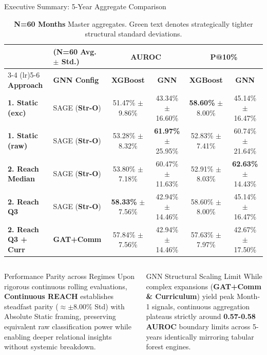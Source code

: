 \documentclass[aspectratio=169,11pt]{beamer}
\begin{document}
\begin{frame}{Executive Summary: 5-Year Aggregate Comparison}

  \renewcommand{\arraystretch}{1.1}
  \begin{table}
    \tiny
    \setlength{\tabcolsep}{4pt}
    \begin{tabular}{ll cccc}
      \toprule
      & \tiny(N=60 Avg. $\pm$ Std.) & \multicolumn{2}{c}{\textbf{AUROC}} & \multicolumn{2}{c}{\textbf{P@10\%}} \\
      \cmidrule(lr){3-4} \cmidrule(lr){5-6}
      \textbf{Approach} & \textbf{GNN Config} & \textbf{XGBoost} & \textbf{GNN} & \textbf{XGBoost} & \textbf{GNN} \\
      \midrule
      \textbf{1. Static (exc)}  & SAGE (\textbf{Str-O})  & 51.47\% $\pm$ 9.86\% & 43.34\% $\pm$ 16.60\% & \textbf{58.60\%} $\pm$ 8.00\% & 45.14\% $\pm$ 16.47\% \\
      \textbf{1. Static (raw)}  & SAGE (\textbf{Str-O})  & 53.28\% $\pm$ 8.32\% & \textbf{61.97\%} $\pm$ 25.95\% & 52.83\% $\pm$ 7.41\% & 60.74\% $\pm$ 21.64\% \\
      \midrule
      \textbf{2. Reach Median}  & SAGE (\textbf{Str-O})  & 53.80\% $\pm$ 7.18\% & 60.47\% $\pm$ 11.63\% & 52.91\% $\pm$ 8.03\% & \textbf{62.63\%} $\pm$ 14.43\% \\
      \textbf{2. Reach Q3}      & SAGE (\textbf{Str-O})  & \textbf{58.33\%} $\pm$ 7.56\% & 42.94\% $\pm$ 14.46\% & 58.60\% $\pm$ 8.00\% & 45.14\% $\pm$ 16.47\% \\
      \midrule
      \textbf{2. Reach Q3 + Curr} & \textbf{GAT+Comm} & 57.84\% $\pm$ 7.56\% & 42.94\% $\pm$ 14.46\% & 57.63\% $\pm$ 7.97\% & 42.67\% $\pm$ 17.50\% \\
      \bottomrule
    \end{tabular}
    \caption{\tiny \textbf{N=60 Months} Master aggregates. Green text denotes strategically tighter structural standard deviations.}
  \end{table}

  \begin{columns}[T]
      \begin{block}{Performance Parity across Regimes}
        \footnotesize 
        Upon rigorous continuous rolling evaluations, \textbf{Continuous REACH} establishes steadfast parity ($\approx \pm 8.00\%$ Std) with Absolute Static framing, preserving equivalent raw classification power while enabling deeper relational insights without systemic breakdown.
      \end{block}
      \begin{alertblock}{GNN Structural Scaling Limit}
        \footnotesize 
        While complex expansions (\textbf{GAT+Comm \& Curriculum}) yield peak Month-1 signals, continuous aggregation plateaus strictly around \textbf{0.57-0.58 AUROC} boundary limits across 5-years identically mirroring tabular forest engines.
      \end{alertblock}
  \end{columns}

\end{frame}
\end{document}

